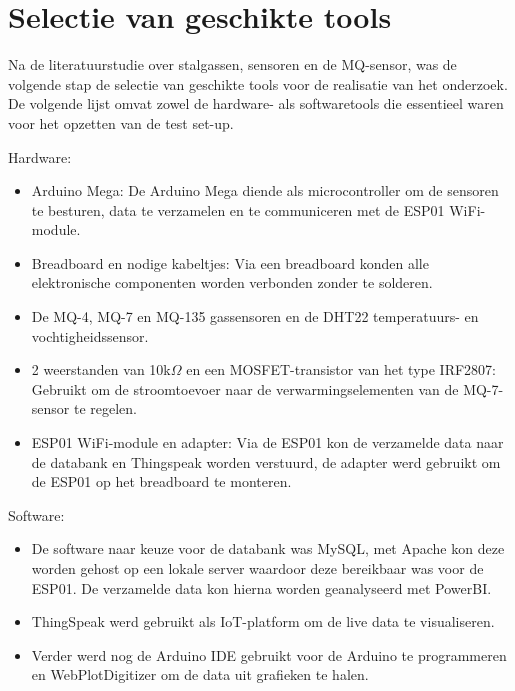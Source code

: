 \section{Selectie van geschikte tools}%
\label{sec:selectie}

Na de literatuurstudie over stalgassen, sensoren en de MQ-sensor, was de volgende stap de selectie van geschikte tools voor de realisatie van het onderzoek. De volgende lijst omvat zowel de hardware- als softwaretools die essentieel waren voor het opzetten van de test set-up.

Hardware:
\begin{itemize}
    \item Arduino Mega: De Arduino Mega diende als microcontroller om de sensoren te besturen, data te verzamelen en te communiceren met de ESP01 WiFi-module.
    \item Breadboard en nodige kabeltjes: Via een breadboard konden alle elektronische componenten worden verbonden zonder te solderen.
    \item De MQ-4, MQ-7 en MQ-135 gassensoren en de DHT22 temperatuurs- en vochtigheidssensor.
    \item 2 weerstanden van 10k$\Omega$ en een MOSFET-transistor van het type IRF2807: Gebruikt om de stroomtoevoer naar de verwarmingselementen van de MQ-7-sensor te regelen.
    \item ESP01 WiFi-module en adapter: Via de ESP01 kon de verzamelde data naar de databank en Thingspeak worden verstuurd, de adapter werd gebruikt om de ESP01 op het breadboard te monteren.
\end{itemize}

Software:
\begin{itemize}
    \item De software naar keuze voor de databank was MySQL, met Apache kon deze worden gehost op een lokale server waardoor deze bereikbaar was voor de ESP01. De verzamelde data kon hierna worden geanalyseerd met PowerBI.
    \item ThingSpeak werd gebruikt als IoT-platform om de live data te visualiseren.
    \item Verder werd nog de Arduino IDE gebruikt voor de Arduino te programmeren en WebPlotDigitizer om de data uit grafieken te halen.
\end{itemize}




